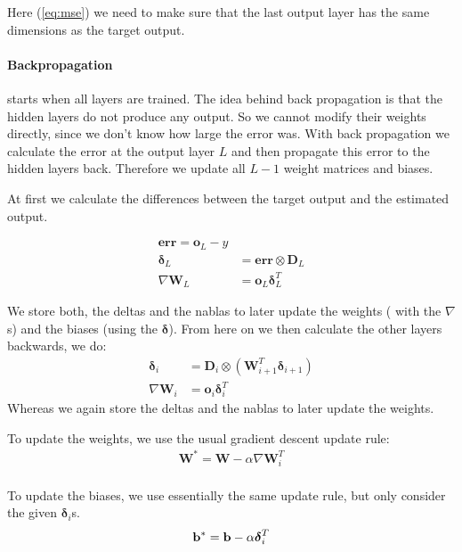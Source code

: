 Here (\ref{eq:mse}) we need to make sure that the last output layer has the same dimensions as the target output.


\paragraph{Backpropagation} starts when all layers are trained. The idea behind back propagation is that the hidden layers do not produce any output. So we cannot modify their weights directly, since we don’t know how large the error was. With back propagation we calculate the error at the output layer $L$ and then propagate this error to the hidden layers back. Therefore we update all $L-1$ weight matrices and biases.

At first we calculate the differences between the target output and the estimated output.

\begin{align}
\boldsymbol{err} = \mathbf{o}_L - y\\
\boldsymbol{\delta}_L &= \mathbf{err} \otimes \mathbf{D}_L\\
\nabla \mathbf{W}_L &= \mathbf{o}_L \boldsymbol{\delta}_L^T
\end{align}

We store both, the deltas and the nablas to later update the weights ( with the $\nabla$s) and the biases (using the $\mathbf{\delta}$).
From here on we then calculate the other layers backwards, we do:
\begin{align}
\boldsymbol{\delta}_i &= \mathbf{D}_i \otimes \left( \mathbf{W}_{i+1}^T \boldsymbol{\delta}_{i+1} \right)\\
\nabla \mathbf{W}_i &= \mathbf{o}_i \boldsymbol{\delta}_i^T
\end{align}
Whereas we again store the deltas and the nablas to later update the weights.

To update the weights, we use the usual gradient descent update rule:
\begin{align}
\mathbf{W}^{*} = \mathbf{W} - \alpha \nabla \mathbf{W}_i^T\\
\end{align}

To update the biases, we use essentially the same update rule, but only consider the given $\boldsymbol{\delta}_{i}$s.
\begin{equation}
\mathbf{b}^{*} = \mathbf{b} - \alpha \boldsymbol{\delta}_i^T\\
\end{equation}

